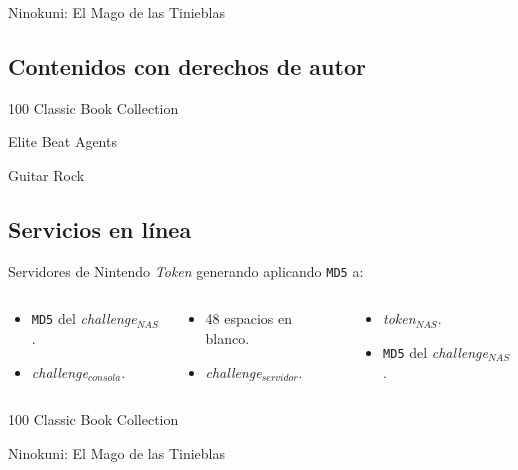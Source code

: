 \begin{frame}{Ninokuni: El Mago de las Tinieblas}

\end{frame}

\subsection{Contenidos con derechos de autor}
\begin{frame}{100 Classic Book Collection}

\end{frame}

\begin{frame}{Elite Beat Agents}

\end{frame}

\begin{frame}{Guitar Rock}

\end{frame}


\subsection{Servicios en línea}
\begin{frame}{Servidores de Nintendo}
\textit{Token} generando aplicando \texttt{MD5} a:
\begin{columns}

\begin{column}{0.33\textwidth}\begin{itemize}
    \item \texttt{MD5} del \textit{challenge}$_{NAS}$.
    \item \textit{challenge}$_{consola}$.
\end{itemize}\end{column}

\begin{column}{0.33\textwidth}\begin{itemize}
    \item 48 espacios en blanco.
    \item \textit{challenge}$_{servidor}$.
\end{itemize}\end{column}

\begin{column}{0.33\textwidth}\begin{itemize}
    \item \textit{token}$_{NAS}$.
    \item \texttt{MD5} del \textit{challenge}$_{NAS}$.
\end{itemize}\end{column}

\end{columns}
\end{frame}

\begin{frame}{100 Classic Book Collection}

\end{frame}

\begin{frame}{Ninokuni: El Mago de las Tinieblas}

\end{frame}
